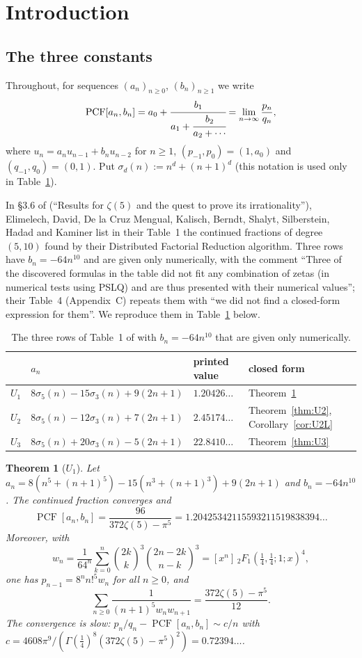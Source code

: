 \documentclass[11pt]{amsart}
\newtheorem{theorem}{Theorem}[section]
\theoremstyle{definition}
\theoremstyle{remark}
\numberwithin{equation}{section}
\newcommand{\PCF}{\operatorname{PCF}}
\begin{document}
\section{Introduction}

\subsection{The three constants}
Throughout, for sequences $(a_n)_{n\ge0}$, $(b_n)_{n\ge1}$ we write
\[
\PCF[a_n,b_n]=a_0+\cfrac{b_1}{a_1+\cfrac{b_2}{a_2+\cdots}}=\lim_{n\to\infty}\frac{p_n}{q_n},
\]
where $u_n=a_nu_{n-1}+b_nu_{n-2}$ for $n\ge1$, $(p_{-1},p_0)=(1,a_0)$ and $(q_{-1},q_0)=(0,1)$. Put $\sigma_d(n):=n^d+(n+1)^d$ (this notation is used only in Table~\ref{tab:three}).

In \S3.6 of \cite{EDCK} (``Results for $\zeta(5)$ and the quest to prove its irrationality''), Elimelech, David, De la Cruz Mengual, Kalisch, Berndt, Shalyt, Silberstein, Hadad and Kaminer list in their Table~1 the continued fractions of degree $(5,10)$ found by their Distributed Factorial Reduction algorithm. Three rows have $b_n=-64n^{10}$ and are given only numerically, with the comment ``Three of the discovered formulas in the table did not fit any combination of zetas (in numerical tests using PSLQ) and are thus presented with their numerical values''; their Table~4 (Appendix~C) repeats them with ``we did not find a closed-form expression for them''. We reproduce them in Table~\ref{tab:three} below.

\begin{table}[ht]
\centering
\begin{tabular}{@{}llll@{}}
\toprule
 & $a_n$ & printed value & closed form\\
\midrule
$U_1$ & $8\sigma_5(n)-15\sigma_3(n)+9(2n+1)$ & $1.20426\ldots$ & Theorem~\ref{thm:U1}\\
$U_2$ & $8\sigma_5(n)-12\sigma_3(n)+7(2n+1)$ & $2.45174\ldots$ & Theorem~\ref{thm:U2}, Corollary~\ref{cor:U2L}\\
$U_3$ & $8\sigma_5(n)+20\sigma_3(n)-5(2n+1)$ & $22.8410\ldots$ & Theorem~\ref{thm:U3}\\
\bottomrule
\end{tabular}
\caption{The three rows of Table~1 of \cite{EDCK} with $b_n=-64n^{10}$ that are given only numerically.}\label{tab:three}
\end{table}

\begin{theorem}[$U_1$]\label{thm:U1}
Let $a_n=8(n^5+(n+1)^5)-15(n^3+(n+1)^3)+9(2n+1)$ and $b_n=-64n^{10}$. The continued fraction converges and
\[
\PCF[a_n,b_n]=\frac{96}{372\zeta(5)-\pi^5}=1.20425342115593211519838394\ldots
\]
Moreover, with
\[
w_n=\frac1{64^n}\sum_{k=0}^n\binom{2k}{k}^3\binom{2n-2k}{n-k}^3=[x^n]\,{}_2F_1(\tfrac14,\tfrac14;1;x)^4,
\]
one has $p_{n-1}=8^nn!^5w_n$ for all $n\ge0$, and
\[
\sum_{n\ge0}\frac{1}{(n+1)^5w_nw_{n+1}}=\frac{372\zeta(5)-\pi^5}{12}.
\]
The convergence is slow: $p_n/q_n-\PCF[a_n,b_n]\sim c/n$ with $c=4608\pi^9/(\Gamma(\frac14)^8(372\zeta(5)-\pi^5)^2)=0.72394\ldots$.
\end{theorem}
\end{document}
